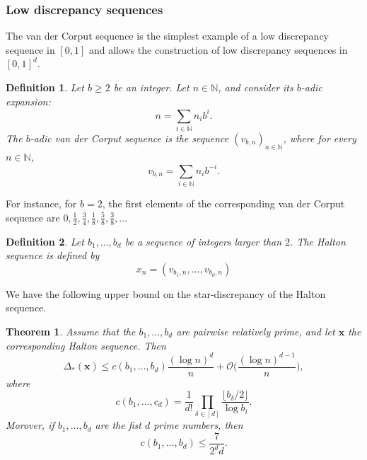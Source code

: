 \documentclass[twoside,11pt]{book}
\newtheorem{theorem}{Theorem}
\newtheorem{definition}{Definition}
\begin{document}
\subsubsection{Low discrepancy sequences}
The van der Corput sequence is the simplest example of a low discrepancy sequence in $[0,1]$ and allows the construction of low discrepancy sequences in $[0,1]^{d}$.
\begin{definition}
Let $b \geq 2$ be an integer. Let $n \in \mathbb{N}$, and consider its $b$-adic expansion:
\begin{equation}
n = \sum\limits_{i \in \mathbb{N}} n_{i}b^{i}.
\end{equation} 
The $b$-adic van der Corput sequence is the sequence $(v_{b,n})_{n \in \mathbb{N}}$, where for every $n \in \mathbb{N}$, 
\begin{equation}
v_{b,n} = \sum\limits_{i \in \mathbb{N}} n_{i}b^{-i}. 
\end{equation}
\end{definition}
For instance, for $b = 2$, the first elements of the corresponding van der Corput sequence are $\displaystyle 0, \frac{1}{2}, \frac{3}{4}, \frac{1}{8}, \frac{5}{8}, \frac{3}{8}, \dots$

\begin{definition}
Let $b_{1}, \dots, b_{d}$ be a sequence of integers larger than $2$. The Halton sequence is defined by
\begin{equation}
x_{n} = (v_{b_1,n}, \dots, v_{b_d,n})
\end{equation}
\end{definition}
We have the following upper bound on the star-discrepancy of the Halton sequence.
\begin{theorem}
Assume that the $b_{1}, \dots, b_{d}$ are pairwise relatively prime, and let $\bm{x}$ the corresponding Halton sequence. Then
\begin{equation}
\Delta_{*}(\bm{x}) \leq c(b_{1}, \dots, b_{d}) \frac{(\log n)^{d}}{n} + \mathcal{O}\bigg(\frac{(\log n)^{d-1}}{n} \bigg),
\end{equation}
where 
\begin{equation}
c(b_{1}, \dots, c_{d}) = \frac{1}{d!} \prod\limits_{\delta \in [d]} \frac{\lfloor b_{\delta}/2 \rfloor }{\log b_{i}}.
\end{equation}
Morover, if $b_{1}, \dots, b_{d}$ are the fist $d$ prime numbers, then 
\begin{equation}
c(b_{1}, \dots, b_{d}) \leq \frac{7}{2^{d}d}.
\end{equation}
\end{theorem}
\end{document}
